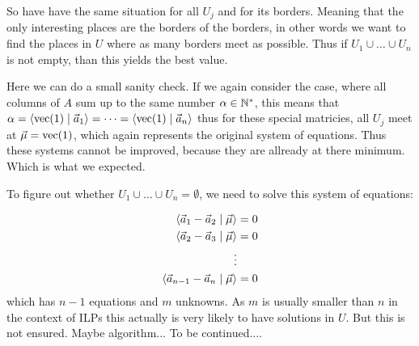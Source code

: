 So have have the same situation for all $U_j$ and for its borders. Meaning that the only interesting places are the borders of the borders, in other words we want to find the places in $U$ where as many borders meet as possible. Thus if $U_1 \cup \dots \cup U_n$ is not empty, than this yields the best value.

Here we can do a small sanity check. If we again consider the case, where all columns of $A$ sum up to the same number $\alpha \in \mathbb{N}^*$, this means that $\alpha = \langle \operatorname{vec}(1) \mid \vec a_1 \rangle = \dots = \langle \operatorname{vec}(1) \mid \vec a_n \rangle$ thus for these special matricies, all $U_j$ meet at $\vec \mu = \operatorname{vec}(1)$, which again represents the original system of equations. Thus these systems cannot be improved, because they are allready at there minimum. Which is what we expected.

To figure out whether $U_1 \cup \dots \cup U_n = \emptyset$, we need to solve this system of equations:

\begin{align*}
    \langle \vec a_1 - \vec a_2 \mid \vec \mu \rangle &= 0\\
    \langle \vec a_2 - \vec a_3 \mid \vec \mu \rangle &= 0\\
    \vdots & \\
    \langle \vec a_{n-1} - \vec a_{n} \mid \vec \mu \rangle &= 0
\end{align*}
which has $n-1$ equations and $m$ unknowns. As $m$ is usually smaller than $n$ in the context of ILPs this actually is very likely to have solutions in $U$. But this is not ensured. Maybe algorithm... To be continued....